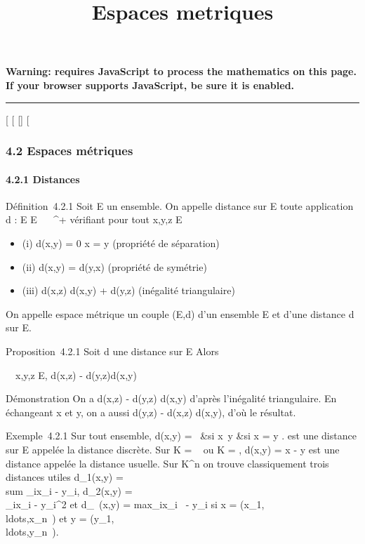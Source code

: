 \documentclass[]{article}
\title{Espaces metriques}
\author{}
\date{}
\begin{document}
\maketitle

\textbf{Warning: 
requires JavaScript to process the mathematics on this page.\\ If your
browser supports JavaScript, be sure it is enabled.}

\begin{center}\rule{3in}{0.4pt}\end{center}

{[}
{[}
{[}{]}
{[}

\subsubsection{4.2 Espaces métriques}

\paragraph{4.2.1 Distances}

Définition~4.2.1 Soit E un ensemble. On appelle distance sur E toute
application d : E \times E \rightarrow~ ~^+ vérifiant pour tout x,y,z \in E

\begin{itemize}
\itemsep1pt\parskip0pt
\item
  (i) d(x,y) = 0 \Leftrightarrow x = y (propriété de
  séparation)
\item
  (ii) d(x,y) = d(y,x) (propriété de symétrie)
\item
  (iii) d(x,z) \leq d(x,y) + d(y,z) (inégalité triangulaire)
\end{itemize}

On appelle espace métrique un couple (E,d) d'un ensemble E et d'une
distance d sur E.

Proposition~4.2.1 Soit d une distance sur E Alors

\forall~~x,y,z \in E, \textbar{}d(x,z) -
d(y,z)\textbar{}\leq d(x,y)

Démonstration On a d(x,z) - d(y,z) \leq d(x,y) d'après l'inégalité
triangulaire. En échangeant x et y, on a aussi d(y,z) - d(x,z) \leq d(x,y),
d'où le résultat.

Exemple~4.2.1 Sur tout ensemble, d(x,y) = \left
\ &si
x\neq~y &si x = y
\cr  \right . est une distance sur E
appelée la distance discrète. Sur K = ~ ou K = , d(x,y) = \textbar{}x -
y\textbar{} est une distance appelée la distance usuelle. Sur
K^n on trouve classiquement trois distances utiles
d\_1(x,y) =\ \\sum
 \_i\textbar{}x\_i - y\_i\textbar{},
d\_2(x,y) =
\sqrt\\\sum
 \_i\textbar{}x\_i -
y\_i\textbar{}^2 et d\_\infty~(x,y)
= max\_i\textbar{}x\_i~ -
y\_i\textbar{} si x =
(x\_1,\\ldots,x\_n~)
et y =
(y\_1,\\ldots,y\_n~).
\end{document}
